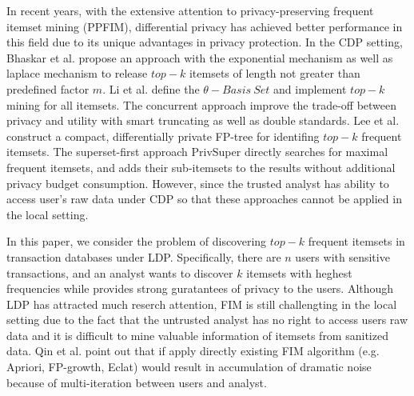 \documentclass[conference]{IEEEtran}
\begin{document}
In recent years, with the extensive attention to privacy-preserving frequent itemset mining (PPFIM), differential privacy has achieved better performance in this field due to its unique advantages in privacy protection. {\color{red}In the CDP setting, Bhaskar et al.\cite{a3} propose an approach with the exponential mechanism as well as laplace mechanism to release $top-k$ itemsets of length not greater than predefined factor $m$. Li et al.\cite{a4} define the $\theta-Basis\ Set$ and implement $top-k$ mining for all itemsets. The concurrent approach\cite{a5} improve the trade-off between privacy and utility with smart truncating as well as double standards. Lee et al.\cite{a6} construct a compact, differentially private FP-tree for identifing $top-k$ frequent itemsets. The superset-first approach PrivSuper\cite{privsuper} directly searches for maximal frequent itemsets, and adds their sub-itemsets to the results without additional privacy budget consumption. However, since the trusted analyst has ability to access user's raw data under CDP so that these approaches cannot be applied in the local setting.} 

In this paper, we consider the problem of discovering $top-k$ frequent itemsets in transaction databases under LDP. Specifically, there are $n$ users with sensitive transactions, and an analyst wants to discover $k$ itemsets with heghest frequencies while provides strong guratantees of privacy to the users. Although LDP has attracted much reserch attention\cite{a1,a2,a8,privtrie,privkv,b1,b2,b3,b4,b5}, FIM is still challengting in the local setting due to the fact that the untrusted analyst has no right to access users raw data and it is difficult to mine valuable information of itemsets from sanitized data. Qin et al.\cite{a1} point out that if apply directly existing FIM algorithm (e.g. Apriori\cite{apriori,apr}, FP-growth\cite{fp}, Eclat\cite{eclat}) would result in accumulation of dramatic noise because of multi-iteration between users and analyst.
\end{document}
